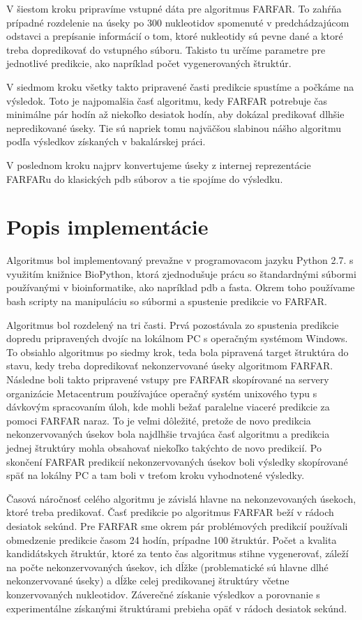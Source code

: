 \indent V šiestom kroku pripravíme vstupné dáta pre algoritmus FARFAR. To zahŕňa prípadné rozdelenie na úseky po 300 nukleotidov spomenuté v predchádzajúcom odstavci a prepísanie informácií o tom, ktoré nukleotidy sú pevne dané a ktoré treba dopredikovať do vstupného súboru. Takisto tu určíme parametre pre jednotlivé predikcie, ako napríklad počet vygenerovaných štruktúr.  


\indent
V siedmom kroku všetky takto pripravené časti predikcie spustíme a počkáme na výsledok. Toto je najpomalšia časť algoritmu, kedy FARFAR potrebuje čas minimálne pár hodín až niekoľko desiatok hodín, aby dokázal predikovať dlhšie nepredikované úseky. Tie sú napriek tomu najväčšou slabinou nášho algoritmu podľa výsledkov získaných v bakalárskej práci.


\indent V poslednom kroku najprv konvertujeme úseky z internej reprezentácie FARFARu do klasických pdb súborov a tie spojíme do výsledku.  


\section{Popis implementácie}
Algoritmus bol implementovaný prevažne v programovacom jazyku Python 2.7. s využitím knižnice BioPython, ktorá zjednodušuje prácu so štandardnými súbormi používanými v bioinformatike, ako napríklad pdb a fasta. Okrem toho používame bash scripty na manipuláciu so súbormi a spustenie predikcie vo FARFAR.


\indent Algoritmus bol rozdelený na tri časti. Prvá pozostávala zo spustenia predikcie dopredu pripravených dvojíc na lokálnom PC s operačným systémom Windows. To obsiahlo algoritmus  po siedmy krok, teda bola pipravená target štruktúra do stavu, kedy treba dopredikovať nekonzervované úseky algoritmom FARFAR. Následne boli takto pripravené vstupy pre FARFAR skopírované na servery organizácie Metacentrum používajúce operačný systém unixového typu s dávkovým spracovaním úloh, kde mohli bežať paralelne viaceré predikcie za pomoci FARFAR naraz. To je veľmi dôležité, pretože de novo predikcia nekonzervovaných úsekov bola najdlhšie trvajúca časť algoritmu a predikcia jednej štruktúry mohla obsahovať niekoľko takýchto de novo predikcií. Po skončení FARFAR predikcií nekonzervovaných úsekov boli výsledky skopírované späť na lokálny PC a tam boli v treťom kroku vyhodnotené výsledky. 


\indent Časová náročnosť celého algoritmu je závislá hlavne na nekonzevovaných úsekoch, ktoré treba predikovať. Časť predikcie po algoritmus FARFAR beží v rádoch desiatok sekúnd. Pre FARFAR sme okrem pár problémových predikcií používali obmedzenie predikcie časom 24 hodín, prípadne 100 štruktúr. Počet a kvalita kandidátskych štruktúr, ktoré za tento čas algoritmus stihne vygenerovať, záleží na počte nekonzervovaných úsekov, ich dĺžke (problematické sú hlavne dlhé nekonzervované úseky) a dĺžke celej predikovanej štruktúry včetne konzervovaných nukleotidov. Záverečné získanie výsledkov a porovnanie s experimentálne získanými štruktúrami prebieha opäť v rádoch desiatok sekúnd.


